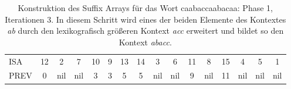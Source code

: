 \begin{table}[H]
\begin{adjustbox}{max width=\textwidth}
\begin{tabular}{lccccccccccccccc}
\multicolumn{1}{l|}{ISA}     & 12                      & 2   & \cellcolor[HTML]{\red}7 & 10 & 9                         & 13                                              & 14                                                 & 3                       & \cellcolor[HTML]{\red}6 & 11 & 8                       & 15  & 4   & 5   & 1   \\
\multicolumn{1}{l|}{PREV}    & 0                       & nil & nil                       & 3  & \cellcolor[HTML]{\red}3 & 5                                               & 5                                                  & nil                     & nil                       & 9  & nil                     & 11  & nil & nil & nil
\end{tabular}
\end{adjustbox}

\caption[Konstruktion des Suffix Arrays f{\"u}r das Wort caabaccaabacaa: Phase 1, Iterationen 3]{Konstruktion des Suffix Arrays f{\"u}r das Wort caabaccaabacaa: Phase 1, Iterationen 3. In diesem Schritt wird eines der beiden Elemente des Kontextes \textit{ab} durch den lexikografisch gr{\"o}{\ss}eren Kontext \textit{acc} erweitert und bildet so den Kontext \textit{abacc}.}
\label{table_complex_example_1_3} 
\end{table}

